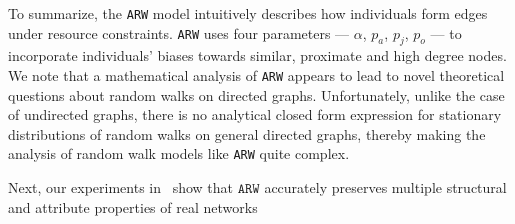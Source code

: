 To summarize, the \texttt{ARW} model
intuitively describes how individuals form edges under resource constraints.
\texttt{ARW} uses four parameters --- $\alpha$, $p_a$, $p_j$, $p_o$ --- to incorporate
individuals' biases towards similar, proximate and high degree nodes.
We note that a mathematical analysis of \texttt{ARW} appears to lead to novel
theoretical questions about random walks on directed graphs.
Unfortunately, unlike the case of undirected graphs, there is no
analytical closed form expression for stationary distributions of random walks
on general directed graphs, thereby making the analysis of random walk models
like \texttt{ARW} quite complex.

Next, our experiments in~ show that $\texttt{ARW}$ accurately preserves
{multiple} structural and attribute properties of real networks

